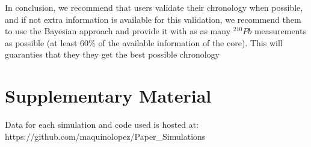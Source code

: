 \documentclass [10pt] {article}
\begin{document}
In conclusion, we recommend that users validate their chronology when possible, and if not extra information is available for this validation, we recommend them to use the Bayesian approach and provide it with as as many $^{210}Pb$ measurements as possible (at least 60\% of the available information of the core).  
This will guaranties that they they get the best possible chronology




\newpage




\section{Supplementary Material}
\label{sec:supp_mat}
Data for each simulation and code used is hosted at: https://github.com/maquinolopez/Paper\_Simulations
\newpage
\end{document}
